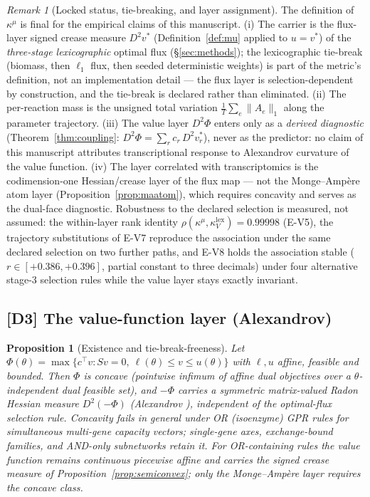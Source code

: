 \documentclass[11pt,a4paper]{article}
\theoremstyle{plain}
\newtheorem{proposition}[theorem]{Proposition}
\theoremstyle{definition}
\theoremstyle{remark}
\newtheorem{remark}[theorem]{Remark}
\newcommand{\kk}{\kappa_{\!V}}
\newcommand{\kmu}{\kappa^{\mu}}
\begin{document}
\begin{remark}[Locked status, tie-breaking, and layer assignment]
\label{rem:lock}
The definition of $\kmu$ is final for the empirical claims of this
manuscript. (i) The carrier is the flux-layer signed crease measure
$D^2 v^*$ (Definition~\ref{def:mu} applied to $u = v^*$) of the
\emph{three-stage lexicographic} optimal flux (\S\ref{sec:methods});
the lexicographic tie-break (biomass, then $\ell_1$ flux, then seeded
deterministic weights) is part of the metric's definition, not an
implementation detail --- the flux layer is selection-dependent by
construction, and the tie-break is declared rather than eliminated.
(ii) The per-reaction mass is the unsigned total variation
$\frac{1}{T}\sum_e \|A_e\|_1$ along the parameter trajectory.
(iii) The value layer $D^2\Phi$ enters only as a \emph{derived
diagnostic} (Theorem~\ref{thm:coupling}:
$D^2\Phi = \sum_r c_r\, D^2 v^*_r$), never as the predictor: no claim
of this manuscript attributes transcriptional response to Alexandrov
curvature of the value function. (iv) The layer correlated with
transcriptomics is the codimension-one Hessian/crease layer of the
flux map --- not the Monge--Amp\`ere atom layer
(Proposition~\ref{prop:maatom}), which requires concavity and serves
as the dual-face diagnostic. Robustness to the declared selection is
measured, not assumed: the within-layer rank identity
$\rho(\kmu, \kk^{\mathrm{lex}}) = 0.99998$ (E-V5), the trajectory
substitutions of E-V7 reproduce the association under the same
declared selection on two further paths, and E-V8 holds the
association stable ($r \in [+0.386, +0.396]$, partial constant to
three decimals) under four alternative stage-3 selection rules while
the value layer stays exactly invariant.
\end{remark}

\subsection{[D3] The value-function layer (Alexandrov)}

\begin{proposition}[Existence and tie-break-freeness]\label{prop:alex}
Let $\Phi(\theta) = \max\{ c^\top v : Sv = 0,\ \ell(\theta) \le v \le
u(\theta)\}$ with $\ell, u$ affine, feasible and bounded. Then $\Phi$ is
concave (pointwise infimum of affine dual objectives over a
$\theta$-independent dual feasible set), and $-\Phi$ carries a symmetric
matrix-valued Radon Hessian measure $D^2(-\Phi)$ (Alexandrov
\citep{alexandrov1939}), independent
of the optimal-flux selection rule. Concavity fails in general under OR
(isoenzyme) GPR rules for simultaneous multi-gene capacity vectors;
single-gene axes, exchange-bound families, and AND-only subnetworks
retain it. For OR-containing rules the value function remains
continuous piecewise affine and carries the signed crease measure of
Proposition~\ref{prop:semiconvex}; only the Monge--Amp\`ere layer
requires the concave class.
\end{proposition}
\end{document}
